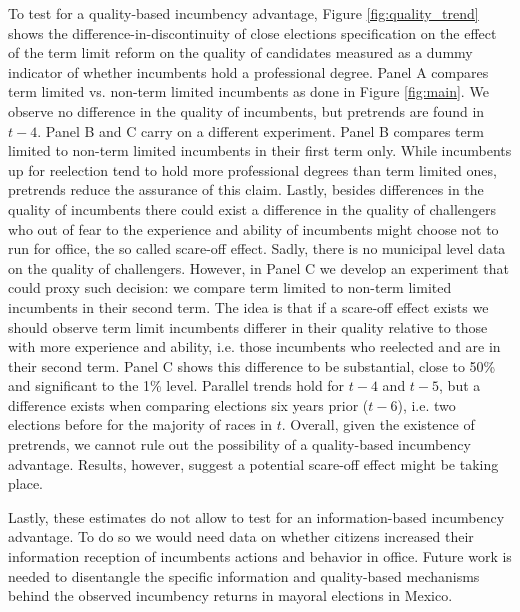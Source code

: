 \documentclass[12pt]{amsart}
\makeatletter
\def\section{\@startsection{section}{1}
	\z@{1.0\linespacing\@plus\linespacing}{.5\linespacing}{\Large}}
\numberwithin{equation}{section}
\theoremstyle{definition}
\theoremstyle{definition}
\theoremstyle{definition}
\makeatother
\begin{document}
To test for a quality-based incumbency advantage, Figure \ref{fig:quality_trend} shows the difference-in-discontinuity of close elections specification on the effect of the term limit reform on the quality of candidates measured as a dummy indicator of whether incumbents hold a professional degree. Panel A compares term limited vs. non-term limited incumbents as done in Figure \ref{fig:main}. We observe no difference in the quality of incumbents, but pretrends are found in $t-4$. Panel B and C carry on a different experiment. Panel B compares term limited to non-term limited incumbents in their first term only. While incumbents up for reelection tend to hold more professional degrees than term limited ones, pretrends reduce the assurance of this claim. Lastly, besides differences in the quality of incumbents there could exist a difference in the quality of challengers who out of fear to the experience and ability of incumbents might choose not to run for office, the so called scare-off effect. Sadly, there is no municipal level data on the quality of challengers. However, in Panel C we develop an experiment that could proxy such decision: we compare term limited to non-term limited incumbents in their second term. The idea is that if a scare-off effect exists we should observe term limit incumbents differer in their quality relative to those with more experience and ability, i.e. those incumbents who reelected and are in their second term. Panel C shows this difference to be substantial, close to 50\% and significant to the 1\% level. Parallel trends hold for $t-4$ and $t-5$, but a difference exists when comparing elections six years prior ($t-6$), i.e. two elections before for the majority of races in $t$. Overall, given the existence of pretrends, we cannot rule out the possibility of a quality-based incumbency advantage. Results, however, suggest a potential scare-off effect might be taking place. 

Lastly, these estimates do not allow to test for an information-based incumbency advantage. To do so we would need data on whether citizens increased their information reception of incumbents actions and behavior in office. Future work is needed to disentangle the specific information and quality-based mechanisms behind the observed incumbency returns in mayoral elections in Mexico. 

  

\section{Conclusion} 
\end{document}
